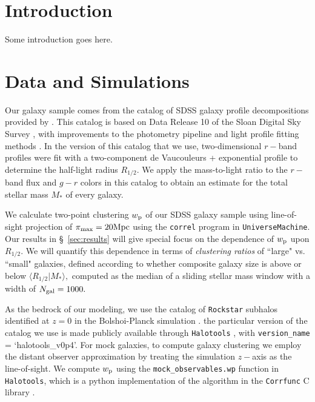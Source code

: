 \documentclass[usenatbib,usegraphicx,letterpaper]{mn2e}
\newcommand{\rhalf}{R_{1/2}}
\newcommand{\mstar}{M_{\ast}}
\newcommand{\wproj}{w_{\rm p}}
\newcommand{\mpc}{{\rm Mpc}}
\begin{document}
\section{Introduction}
\label{sec:intro}
Some introduction goes here.

\section{Data and Simulations}
\label{sec:data}

Our galaxy sample comes from the catalog of SDSS galaxy profile decompositions provided by \citet{meert_etal15}. This catalog is based on Data Release 10 of the Sloan Digital Sky Survey \citep[SDSS,][]{ahn_etal14}, with improvements to the photometry pipeline and light profile fitting methods \citep{vikram_etal10,bernardi_etal13,bernardi_etal14,meert_etal13}. In the version of this catalog that we use, two-dimensional $r-$band profiles were fit with a two-component de Vaucouleurs + exponential profile to determine the half-light radius $\rhalf.$ We apply the \citet{bell_etal03} mass-to-light ratio to the $r-$band flux and $g-r$ colors in this catalog to obtain an estimate for the total stellar mass $\mstar$ of every galaxy.

We calculate two-point clustering $\wproj$ of our SDSS galaxy sample using line-of-sight projection of $\pi_{\rm max}=20\mpc$ using the {\tt correl} program in {\tt UniverseMachine}. Our results in \S~\ref{sec:results} will give special focus on the dependence of $\wproj$ upon $\rhalf.$ We will quantify this dependence in terms of {\em clustering ratios} of ``large" vs. ``small" galaxies, defined according to whether composite galaxy size is above or below $\langle\rhalf\vert\mstar\rangle,$ computed as the median of a sliding stellar mass window with a width of $N_{\rm gal}=1000.$

As the bedrock of our modeling, we use the catalog of {\tt Rockstar} subhalos identified at $z=0$ in the Bolshoi-Planck simulation \citep{klypin_etal11,behroozi12_rockstar,behroozi12_consistent_trees,riebe_etal13,rodriguez_puebla16_bolplanck}. the particular version of the catalog we use is made publicly available through {\tt Halotools} \citep{hearin_etal16}, with {\tt version\_name} = `halotools\_v0p4'. For mock galaxies, to compute galaxy clustering we employ the distant observer approximation by treating the simulation $z-$axis as the line-of-sight. We compute $\wproj$ using the {\tt mock\_observables.wp} function in {\tt Halotools}, which is a python implementation of the algorithm in the {\tt Corrfunc} C library \citep{sinha_etal17}. 
\end{document}
